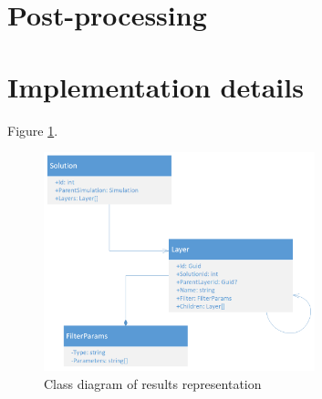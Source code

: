 \section{Post-processing}
\label{sec:postprocessing}


\section{Implementation details}
\label{sec:implementation-details}



Figure \ref{fig:results-class-diagram}.

\begin{figure}[H]
    \centering
    \includegraphics[width=0.7\textwidth]{figures/results-class-diagram}
    \decoRule
    \caption{Class diagram of results representation}
    \label{fig:results-class-diagram}
\end{figure}